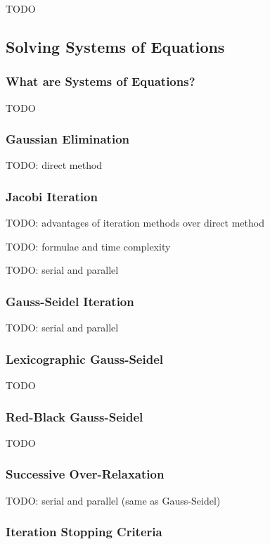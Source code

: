 \documentclass{article}
\begin{document}
TODO

\subsection{Solving Systems of Equations}

\subsubsection{What are Systems of Equations?}

TODO

\subsubsection{Gaussian Elimination}

TODO: direct method

\subsubsection{Jacobi Iteration}

TODO: advantages of iteration methods over direct method

TODO: formulae and time complexity

TODO: serial and parallel

\subsubsection{Gauss-Seidel Iteration}

TODO: serial and parallel

\subsubsection{Lexicographic Gauss-Seidel}

TODO

\subsubsection{Red-Black Gauss-Seidel}

TODO

\subsubsection{Successive Over-Relaxation}

TODO: serial and parallel (same as Gauss-Seidel)

\subsubsection{Iteration Stopping Criteria}
\end{document}
